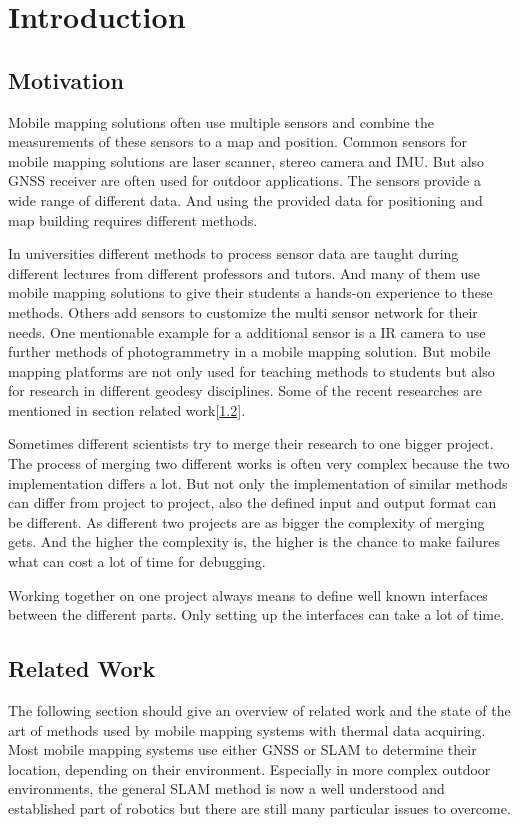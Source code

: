 \chapter{Introduction}\label{ch:introduction}

\section{Motivation}\label{sec:motivation}

Mobile mapping solutions often use multiple sensors and combine the measurements of these sensors to a map and position.
Common sensors for mobile mapping solutions are laser scanner, stereo camera and \ac{IMU}.
But also \ac{GNSS} receiver are often used for outdoor applications.
The sensors provide a wide range of different data.
And using the provided data for positioning and map building requires different methods.

In universities different methods to process sensor data are taught during different lectures from different professors and tutors.
And many of them use mobile mapping solutions to give their students a hands-on experience to these methods.
Others add sensors to customize the multi sensor network for their needs.
One mentionable example for a additional sensor is a \ac{IR} camera to use further methods of photogrammetry in a mobile mapping solution.
But mobile mapping platforms are not only used for teaching methods to students but also for research in different geodesy disciplines.
Some of the recent researches are mentioned in section related work[\ref{sec:related-work}].

Sometimes different scientists try to merge their research to one bigger project.
The process of merging two different works is often very complex because the two implementation differs a lot.
But not only the implementation of similar methods can differ from project to project, also the defined input and output format can be different.
As different two projects are as bigger the complexity of merging gets.
And the higher the complexity is, the higher is the chance to make failures what can cost a lot of time for debugging.

Working together on one project always means to define well known interfaces between the different parts.
Only setting up the interfaces can take a lot of time.

\section{Related Work}\label{sec:related-work}
The following section should give an overview of related work and the state of the art of methods used by mobile mapping systems with thermal data acquiring.
Most mobile mapping systems use either \ac{GNSS} or \ac{SLAM} to determine their location, depending on their environment.
Especially in more complex outdoor environments, the general \ac{SLAM} method is now a well understood and established part of robotics but there are still many particular issues to overcome\cite{durrant-Whyte2006}.

